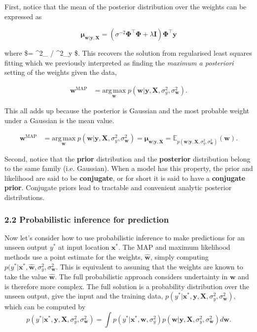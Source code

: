 \documentclass[11pt]{article}
\begin{document}
First, notice that the mean of the posterior distribution over the
weights can be expressed as

\[
\mathbf{\mu}_{\mathbf{w} | \mathbf{y}, \mathbf{X} }  = (\sigma^{-2}\boldsymbol{\Phi}^\top \boldsymbol{\Phi} + \lambda \mathbf{I})\boldsymbol{\Phi}^\top \mathbf{y}
\]

where \$\lambda = \sigma\^{}2\_ / \sigma\^{}2\_y \$. This
recovers the solution from regularised least squares fitting which we
previously interpreted as finding the \emph{maximum a posteriori}
setting of the weights given the data,

\begin{align}
\mathbf{w}^{\text{MAP}} & = \underset{\mathbf{w}}{\mathrm{arg\,max}} \; p(\mathbf{w} | \mathbf{y},\mathbf{X},\sigma_y^2,\sigma_{\mathbf{w}}^2).
\end{align}

This all adds up because the posterior is Gaussian and the most probable
weight under a Gaussian is the mean value.

\begin{align}
\mathbf{w}^{\text{MAP}} & = \underset{\mathbf{w}}{\mathrm{arg\,max}} \; p(\mathbf{w} | \mathbf{y},\mathbf{X},\sigma_y^2,\sigma_{\mathbf{w}}^2) = \mathbf{\mu}_{\mathbf{w} | \mathbf{y}, \mathbf{X} } = \mathbb{E}_{p(\mathbf{w} | \mathbf{y},\mathbf{X},\sigma_y^2,\sigma_{\mathbf{w}}^2)}(\mathbf{w}).
\end{align}

Second, notice that the \textbf{prior} distribution and the
\textbf{posterior} distribution belong to the same family (i.e.
Gaussian). When a model has this property, the prior and likelihood are
said to be \textbf{conjugate}, or for short it is said to have a
\textbf{conjugate prior}. Conjugate priors lead to tractable and
convenient analytic posterior distributions.

    \subsubsection{2.2 Probabilistic inference for
prediction}\label{probabilistic-inference-for-prediction}

Now let's consider how to use probabilistic inference to make
predictions for an unseen output \(y^*\) at input location
\(\mathbf{x}^*\). The MAP and maximum likelihood methods use a point
estimate for the weights, \(\hat{\mathbf{w}}\), simply computing
\(p(y^* | \mathbf{x}^*, \hat{\mathbf{w}},\sigma_y^2,\sigma_{\mathbf{w}}^2\).
This is equivalent to assuning that the weights are known to take the
value \(\hat{\mathbf{w}}\). The full probabilistic approach considers
undertainty in \(\mathbf{w}\) and is therefore more complex. The full
solution is a probability distribution over the unseen output, give the
input and the training data,
\(p(y^* | \mathbf{x}^*, \mathbf{y},\mathbf{X},\sigma_y^2,\sigma_{\mathbf{w}}^2)\),
which can be computed by \[
p(y^* | \mathbf{x}^*, \mathbf{y},\mathbf{X},\sigma_y^2,\sigma_{\mathbf{w}}^2) = \int p(y^* | \mathbf{x}^*, \mathbf{w},\sigma_y^2) p(\mathbf{w}|\mathbf{y},\mathbf{X},\sigma_y^2,\sigma_{\mathbf{w}}^2) d\mathbf{w}.
\]
\end{document}
